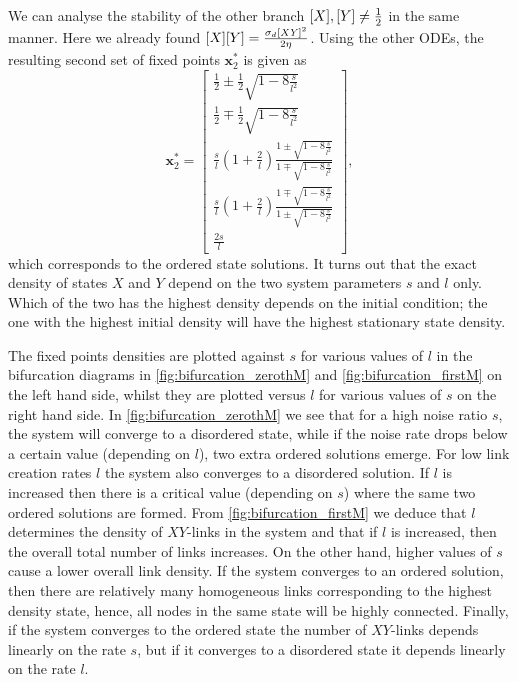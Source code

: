 We can analyse the stability of the other branch $[X],[Y] \neq \frac{1}{2}$ in the same manner. Here we already found $[X][Y]=\frac{\sigma_d \mathit{[XY]}^2}{2\eta}$. Using the other ODEs, the resulting second set of fixed points $\bm{x}^*_2$ is given as
\begin{equation}
\bm{x}^*_2 = 
\begin{bmatrix}
\frac{1}{2} \pm \frac{1}{2} \sqrt{1-8 \frac{s}{l^2}}\\[1ex]
\frac{1}{2} \mp \frac{1}{2} \sqrt{1-8 \frac{s}{l^2}}\\[1ex]
\frac{s}{l} \left( 1+ \frac{2}{l} \right) \frac{1 \pm \sqrt{1-8\frac{s}{l^2}}}{1 \mp \sqrt{1-8\frac{s}{l^2}}}\\[1ex]
\frac{s}{l} \left( 1+ \frac{2}{l} \right) \frac{1 \mp \sqrt{1-8\frac{s}{l^2}}}{1 \pm \sqrt{1-8\frac{s}{l^2}}}\\[1ex]
\frac{2s}{l}
\end{bmatrix},
\end{equation}
which corresponds to the ordered state solutions. It turns out that the exact density of states $X$ and $Y$ depend on the two system parameters $s$ and $l$ only. Which of the two has the highest density depends on the initial condition; the one with the highest initial density will have the highest stationary state density. 

The fixed points densities are plotted against $s$ for various values of $l$ in the bifurcation diagrams in \cref{fig:bifurcation_zerothM} and \cref{fig:bifurcation_firstM} on the left hand side, whilst they are plotted versus $l$ for various values of $s$ on the right hand side. In \cref{fig:bifurcation_zerothM} we see that for a high noise ratio $s$, the system will converge to a disordered state, while if the noise rate drops below a certain value (depending on $l$), two extra ordered solutions emerge. For low link creation rates $l$ the system also converges to a disordered solution. If $l$ is increased then there is a critical value (depending on $s$) where the same two ordered solutions are formed. From \cref{fig:bifurcation_firstM} we deduce that $l$ determines the density of $XY$-links in the system and that if $l$ is increased, then the overall total number of links increases. On the other hand, higher values of $s$ cause a lower overall link density. If the system converges to an ordered solution, then there are relatively many homogeneous links corresponding to the highest density state, hence, all nodes in the same state will be highly connected. Finally, if the system converges to the ordered state the number of $XY$-links depends linearly on the rate $s$, but if it converges to a disordered state it depends linearly on the rate $l$. 


